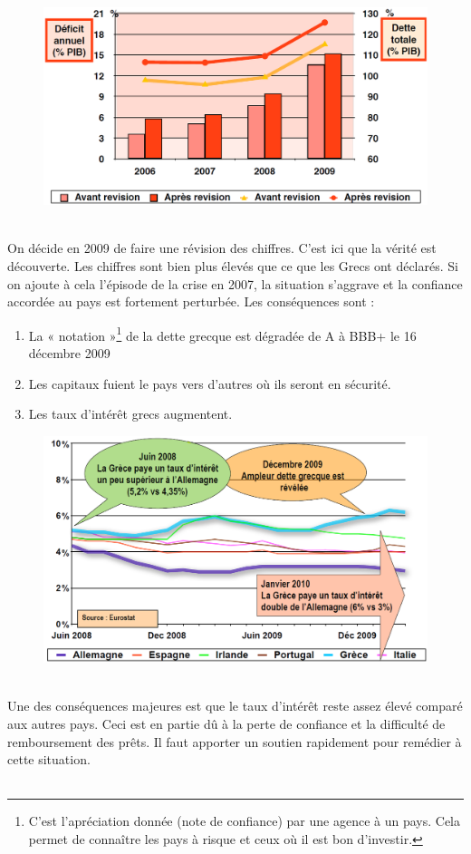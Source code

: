 \begin{figure}
\includegraphics[scale=0.3]{37}
\end{figure}
\ \\ On décide en 2009 de faire une révision des chiffres. C'est ici que la vérité est découverte. Les chiffres sont bien plus élevés que ce que les Grecs ont déclarés. Si on ajoute à cela l'épisode de la crise en 2007, la situation s'aggrave et la confiance accordée au pays est fortement perturbée. Les conséquences sont :

\begin{enumerate}
	\item La « notation »\footnote{C'est l'apréciation donnée (note de confiance) par une agence à un pays. Cela permet de connaître les pays à risque et ceux où il est bon d'investir.} de la dette grecque est dégradée de A à BBB+ le 16 décembre 2009

	\item Les capitaux fuient le pays vers d'autres où ils seront en sécurité.
	
	\item Les taux d’intérêt grecs augmentent.
\end{enumerate}   

\begin{figure}
\includegraphics[scale=0.3]{38}
\end{figure}
\ \\ Une des conséquences majeures est que le taux d'intérêt reste assez élevé comparé aux autres pays. Ceci est en partie dû à la perte de confiance et la difficulté de remboursement des prêts. Il faut apporter un soutien rapidement pour remédier à cette situation. \\\\

